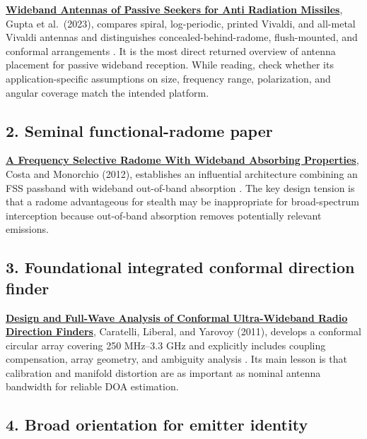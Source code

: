 \documentclass[
  10pt,
]{article}
\begin{document}
\href{https://consensus.app/papers/details/04301748949257caa17485d3480352f2/?utm_source=chatgpt}{\textbf{Wideband
Antennas of Passive Seekers for Anti Radiation Missiles}}, Gupta et
al.~(2023), compares spiral, log-periodic, printed Vivaldi, and
all-metal Vivaldi antennas and distinguishes concealed-behind-radome,
flush-mounted, and conformal arrangements \citep{gupta2023}. It is the
most direct returned overview of antenna placement for passive wideband
reception. While reading, check whether its application-specific
assumptions on size, frequency range, polarization, and angular coverage
match the intended platform.

\subsection{2. Seminal functional-radome
paper}\label{seminal-functional-radome-paper}

\href{https://consensus.app/papers/details/1811b78b36fa5cc0840c16f9dd6f2a1b/?utm_source=chatgpt}{\textbf{A
Frequency Selective Radome With Wideband Absorbing Properties}}, Costa
and Monorchio (2012), establishes an influential architecture combining
an FSS passband with wideband out-of-band absorption \citep{costa2012}.
The key design tension is that a radome advantageous for stealth may be
inappropriate for broad-spectrum interception because out-of-band
absorption removes potentially relevant emissions.

\subsection{3. Foundational integrated conformal direction
finder}\label{foundational-integrated-conformal-direction-finder}

\href{https://consensus.app/papers/details/5f166a5e2c715f25a2cfa7d55f20749f/?utm_source=chatgpt}{\textbf{Design
and Full-Wave Analysis of Conformal Ultra-Wideband Radio Direction
Finders}}, Caratelli, Liberal, and Yarovoy (2011), develops a conformal
circular array covering 250 MHz--3.3 GHz and explicitly includes
coupling compensation, array geometry, and ambiguity analysis
\citep{caratelli2011}. Its main lesson is that calibration and manifold
distortion are as important as nominal antenna bandwidth for reliable
DOA estimation.

\subsection{4. Broad orientation for emitter
identity}\label{broad-orientation-for-emitter-identity}
\end{document}
